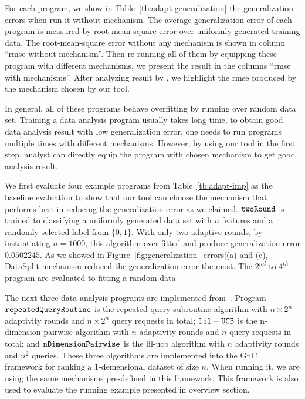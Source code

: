 For each program, we show in Table~\ref{tb:adapt-generalization} the generalization errors when run it without mechanism.
The average generalization error of each program is measured by root-mean-square error over uniformly generated training data.
The root-mean-square error without any mechanism is shown in column ``rmse without mechanism''.
Then re-running all of them by equipping these program with different mechanisms, we present the result
in the columns ``rmse with mechanisms''.
After analyzing result by {\THESYSTEM}, we highlight the rmse produced by the mechanism chosen by our tool.

In general, all of these programs behave overfitting by running over random data set. 
Training a data analysis program usually takes long time, to obtain good data analysis result with low generalization error,
one needs to run programs multiple times with different mechanisms.
However, by using our tool in the first step, analyst can directly equip the program with chosen mechanism to get good
analysis result.


We first evaluate four example programs from Table~\ref{tb:adapt-imp} as the baseline evaluation to show that our tool can choose the mechanism that performs best in reducing the generalization error as we claimed.
$\mathtt{twoRound}$ is trained to classifying a uniformly generated data set with $n$ features and a randomly selected label from $\{0, 1\}$. 
With only two adaptive rounds, by instantiating $n = 1000$, this algorithm over-fitted and produce generalization error 
$0.0502245$. As we showed in Figure~\ref{fig:generalization_errors}(a) and (c),
DataSplit mechanism reduced the generalization error the most.
The $2^{nd}$ to $4^{th}$ program are evaluated to fitting a random data 


The next three data analysis programs are implemented from~\cite{Jamieson2015TheAO}.
Program $\mathtt{repeatedQueryRoutine}$ is the
repeated query subroutine algorithm with $n\times 2^n$ adaptivity rounds and $n\times 2^n$ query requests in total;
$\mathtt{lil-UCB}$ is the n-dimension pairwise algorithm with $n$ adaptivity rounds and $n$ query requests in total;
and $\mathtt{nDimensionPairwise}$ is the lil-ucb algorithm with $n$ adaptivity rounds and $n^2$ queries.
These three algorithms are implemented into the GnC~\cite{BassilyNSSSU16} framework for ranking
a $1$-demensional dataset of size $n$.
When running it, we are using the same mechanisms pre-defined in this framework.
This framework is also used to evaluate the running example presented in overview section.

